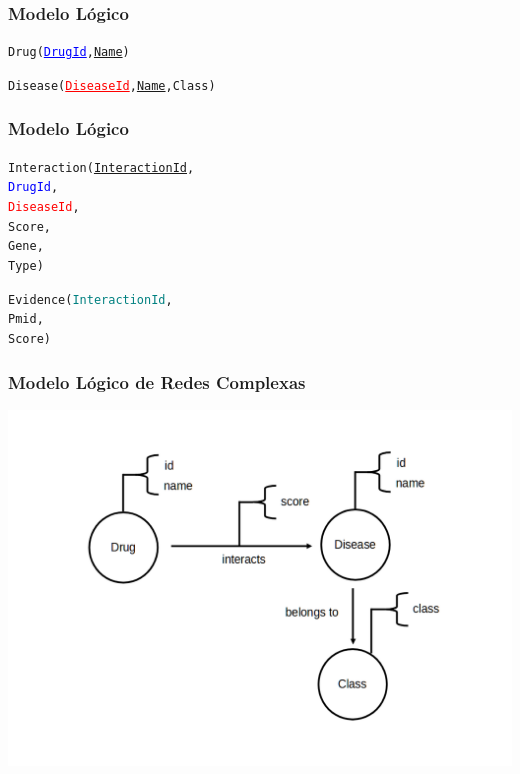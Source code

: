 \documentclass[12pt]{beamer}
\begin{document}
\begin{frame}[fragile]
  \frametitle{Modelo Lógico}

  \begin{alltt}
    Drug(\textcolor{blue}{\underline{DrugId}}, \underline{Name})
    
    Disease(\textcolor{red}{\underline{DiseaseId}}, \underline{Name}, Class)
    
  \end{alltt}
\end{frame}

\begin{frame}[fragile]
  \frametitle{Modelo Lógico}

  \begin{alltt}
    Interaction(\underline{InteractionId},
                \textcolor{blue}{DrugId},
                \textcolor{red}{DiseaseId},
                Score,
                Gene,
                Type)
               
    Evidence(\textcolor{teal}{InteractionId},
                Pmid,
                Score)
                  
  \end{alltt}
\end{frame}

\begin{frame}[fragile]
  \frametitle{Modelo Lógico de Redes Complexas}
  \centering
  \includegraphics[scale=0.275]{logicografo.png}
\end{frame}
\end{document}
